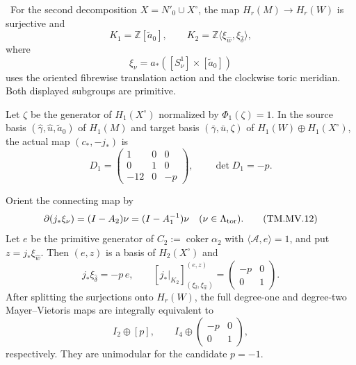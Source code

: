\begin{proposition}
\label{mapsI:top:prop:cusp-mv-blocks}
\ For the second decomposition $X=N'_0\cup X^\circ$, the map
$H_r(M)\to H_r(W)$ is surjective and
\[
 K_1=\mathbb Z[\widetilde a_0],
 \qquad
 K_2=\mathbb Z\langle
       \xi_{\widehat w},\xi_{\widehat\delta}\rangle,
\tag{TM.MV.10}
\]
where
\[
 \xi_\nu=a_*([S^1_\nu]\times[\widetilde a_0])
\]
uses the oriented fibrewise translation action and the clockwise toric
meridian.  Both displayed subgroups are primitive.

Let $\zeta$ be the generator of $H_1(X^\circ)$ normalized by
$\Phi_1(\zeta)=1$.  In the source basis
$(\widehat\gamma,\widehat u,\widetilde a_0)$ of $H_1(M)$ and target basis
$(\bar\gamma,\bar u,\zeta)$ of
$H_1(W)\oplus H_1(X^\circ)$, the actual map
$(c_*,-j_*)$ is
\[
 D_1=
 \begin{pmatrix}
 1&0&0\\
 0&1&0\\
 -12&0&-p
 \end{pmatrix},
 \qquad \det D_1=-p.
\tag{TM.MV.11}
\]

Orient the connecting map by
\[
 \partial(j_*\xi_\nu)=(I-A_2)\nu=(I-A_1^{-1})\nu
 \quad(\nu\in\Lambda_{\rm tor}).
\tag{TM.MV.12}
\]
Let $e$ be the primitive generator of
$C_2:=\operatorname{coker}\alpha_2$ with
$\langle\mathcal A,e\rangle=1$, and put
$z=j_*\xi_{\widehat w}$.  Then $(e,z)$ is a basis of
$H_2(X^\circ)$ and
\[
 j_*\xi_{\widehat\delta}=-p\,e,
 \qquad
 [j_*|_{K_2}]_{(\xi_{\widehat\delta},\xi_{\widehat w})}^{(e,z)}
 =\begin{pmatrix}-p&0\\0&1\end{pmatrix}.
\tag{TM.MV.13}
\]
After splitting the surjections onto $H_r(W)$, the full degree-one and
degree-two Mayer--Vietoris maps are integrally equivalent to
\[
 I_2\oplus[p],
 \qquad
 I_4\oplus
 \begin{pmatrix}-p&0\\0&1\end{pmatrix},
\tag{TM.MV.14}
\]
respectively.  They are unimodular for the candidate $p=-1$.
\end{proposition}

